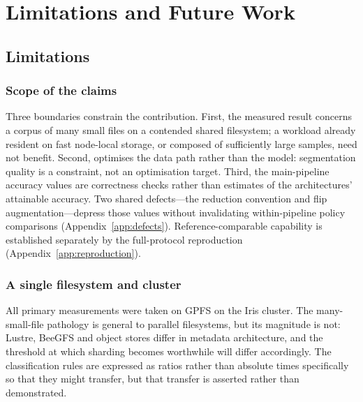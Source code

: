 \section{Limitations and Future Work}
\label{ch:futurework}

\subsection{Limitations}

\subsubsection{Scope of the claims}

Three boundaries constrain the contribution. First, the measured result concerns
a corpus of many small files on a contended shared filesystem; a workload already
resident on fast node-local storage, or composed of sufficiently large samples,
need not benefit. Second, \pads{} optimises the data path rather than the model:
segmentation quality is a constraint, not an optimisation target. Third, the
main-pipeline accuracy values are correctness checks rather than estimates of the
architectures' attainable accuracy. Two shared defects---the reduction convention
and flip augmentation---depress those values without invalidating within-pipeline
policy comparisons (Appendix~\ref{app:defects}). Reference-comparable capability
is established separately by the full-protocol reproduction
(Appendix~\ref{app:reproduction}).

\subsubsection{A single filesystem and cluster}
All primary measurements were taken on GPFS on the Iris cluster.
The many-small-file pathology is general to parallel filesystems, but its magnitude
is not: Lustre, BeeGFS and object stores differ in metadata architecture, and the
threshold at which sharding becomes worthwhile will differ accordingly.
The classification rules are expressed as ratios rather than absolute times
specifically so that they might transfer, but that transfer is asserted rather than
demonstrated.

